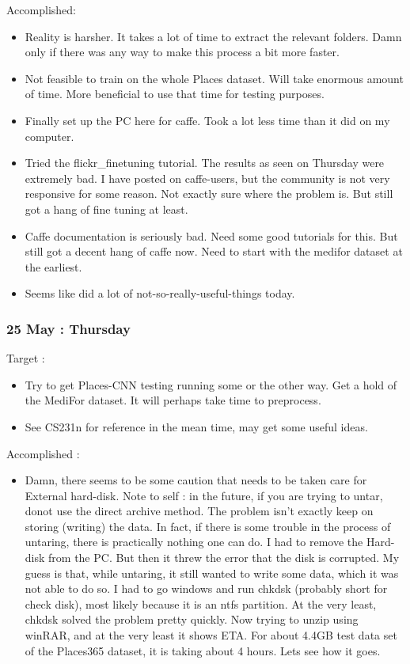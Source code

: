 \documentclass{article}
\begin{document}
Accomplished:
\begin{itemize}
\item Reality is harsher. It takes a lot of time to extract the relevant folders. Damn only if there was any way to make this process a bit more faster.
\item Not feasible to train on the whole Places dataset. Will take enormous amount of time. More beneficial to use that time for testing purposes.
\item Finally set up the PC here for caffe. Took a lot less time than it did on my computer.
\item Tried the flickr\_finetuning tutorial. The results as seen on Thursday were extremely bad. I have posted on caffe-users, but the community is not very responsive for some reason. Not exactly sure where the problem is. But still got a hang of fine tuning at least.
\item Caffe documentation is seriously bad. Need some good tutorials for this. But still got a decent hang of caffe now. Need to start with the medifor dataset at the earliest.
\item Seems like did a lot of not-so-really-useful-things today.
\end{itemize}

\subsubsection{25 May : Thursday}
Target :
\begin{itemize}
\item Try to get Places-CNN testing running some or the other way. Get a hold of the MediFor dataset. It will perhaps take time to preprocess.
\item See CS231n for reference in the mean time, may get some useful ideas.
\end{itemize}

Accomplished :
\begin{itemize}
\item Damn, there seems to be some caution that needs to be taken care for External hard-disk. Note to self : in the future, if you are trying to untar, donot use the direct archive method. The problem isn't exactly keep on storing (writing) the data. In fact, if there is some trouble in the process of untaring, there is practically nothing one can do. I had to remove the Hard-disk from the PC. But then it threw the error that the disk is corrupted. My guess is that, while untaring, it still wanted to write some data, which it was not able to do so. I had to go windows and run chkdsk (probably short for check disk), most likely because it is an ntfs partition. At the very least, chkdsk solved the problem pretty quickly. Now trying to unzip using winRAR, and at the very least it shows ETA. For about 4.4GB test data set of the Places365 dataset, it is taking about 4 hours. Lets see how it goes. 
\end{itemize}
\end{document}
